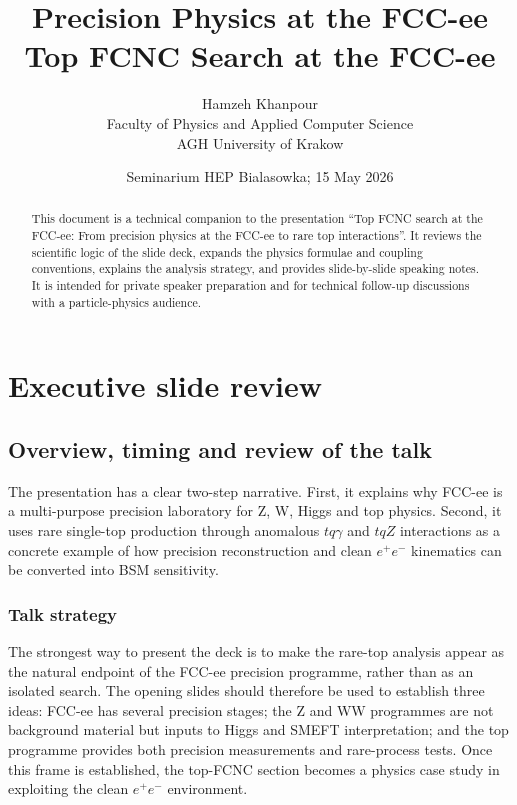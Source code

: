 \documentclass[11pt,a4paper]{report}
\title{\bfseries Precision Physics at the FCC-ee\\[0.4em] Top FCNC Search at the FCC-ee}
\author{Hamzeh Khanpour\\Faculty of Physics and Applied Computer Science\\AGH University of Krakow}
\date{Seminarium HEP Bialasowka; 15 May 2026}
\newcommand{\ee}{e^+e^-}
\begin{document}
	
	
\maketitle

\begin{abstract}
	
This document is a technical companion to the presentation ``Top FCNC search at the FCC-ee: From precision physics at the FCC-ee to rare top interactions''.  It reviews the scientific logic of the slide deck, expands the physics formulae and coupling conventions, explains the analysis strategy, and provides slide-by-slide speaking notes.  It is intended for private speaker preparation and for technical follow-up discussions with a particle-physics audience.

\end{abstract}

\tableofcontents
\clearpage



\part{Executive slide review}

\chapter{Overview, timing and review of the talk}

\begin{keymessagebox}
	
The presentation has a clear two-step narrative.  First, it explains why FCC-ee is a multi-purpose precision laboratory for Z, W, Higgs and top physics.  Second, it uses rare single-top production through anomalous $tq\gamma$ and $tqZ$ interactions as a concrete example of how precision reconstruction and clean $\ee$ kinematics can be converted into BSM sensitivity.
\end{keymessagebox}


\section{Talk strategy}

The strongest way to present the deck is to make the rare-top analysis appear as the natural endpoint of the FCC-ee precision programme, rather than as an isolated search.  The opening slides should therefore be used to establish three ideas: FCC-ee has several precision stages; the Z and WW programmes are not background material but inputs to Higgs and SMEFT interpretation; and the top programme provides both precision measurements and rare-process tests.  Once this frame is established, the top-FCNC section becomes a physics case study in exploiting the clean $\ee$ environment.
\end{document}
